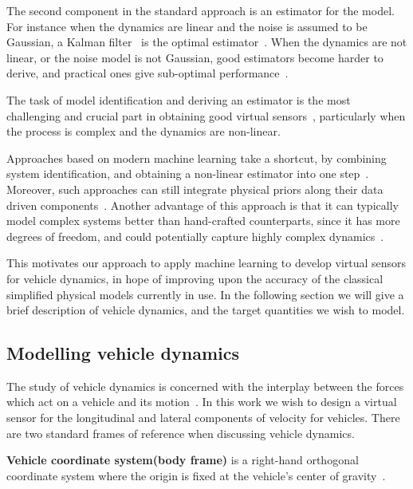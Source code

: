 \documentclass[../main.tex]{subfiles}
\begin{document}
The second component in the standard approach is an estimator for the model. For instance when the dynamics are linear and the noise is assumed to be Gaussian, a Kalman filter~\citep{zarchan2013fundamentals} is the optimal estimator~\citep{canale2008study}. When the dynamics are not linear, or the noise model is not Gaussian, good estimators become harder to derive, and practical ones give sub-optimal performance~\citep{milanese2006filter}. 

The task of model identification and deriving an estimator is the most challenging and crucial part in obtaining good virtual sensors~\citep{li2011review}, particularly when the process is complex and the dynamics are non-linear.  

Approaches based on modern machine learning take a shortcut, by combining system identification, and obtaining a non-linear estimator into one step~\citep{rastogi2017virtual}. Moreover, such approaches can still integrate physical priors along their data driven components~\citep{costa1999hybrid, graber2018hybrid}. Another advantage of this approach is that it can typically model complex systems better than hand-crafted counterparts, since it has more degrees of freedom, and could potentially capture highly complex dynamics~\cite{li2011review}. 

This motivates our approach to apply machine learning to develop virtual sensors for vehicle dynamics, in hope of improving upon the accuracy of the classical simplified physical models currently in use. In the following section we will give a brief description of vehicle dynamics, and the target quantities we wish to model. 

\subsection{Modelling vehicle dynamics}
\label{sec:vehicle_dynamics}


The study of vehicle dynamics is concerned with the interplay between the forces which act on a vehicle and its motion~\citep{schramm2014vehicle}. In this work we wish to design a virtual sensor for the longitudinal and lateral components of velocity for vehicles. There are two standard frames of reference when discussing vehicle dynamics. 

\textbf{Vehicle coordinate system(body frame)} is a right-hand orthogonal coordinate system where the origin is fixed at the vehicle's center of gravity~\citep{gill2000vehicle}.
\end{document}
